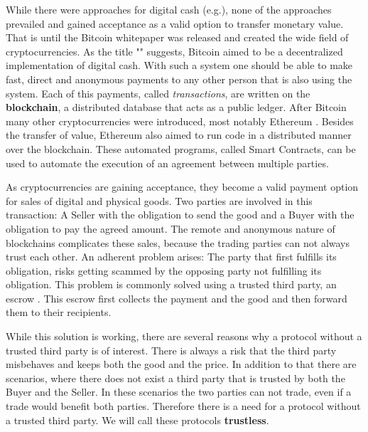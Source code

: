 \documentclass{cacthesis}
\begin{document}
	While there were approaches for digital cash (e.g.\cite{chaum_83}), none of the approaches prevailed and gained acceptance as a valid option to transfer monetary value. That is until the Bitcoin whitepaper \cite{nakamoto_bitcoin_nodate} was released and created the wide field of cryptocurrencies. As the title "" suggests, Bitcoin aimed to be a decentralized implementation of digital cash. With such a system one should be able to make fast, direct and anonymous payments to any other person that is also using the system. Each of this payments, called \emph{transactions}, are written on the \textbf{blockchain}, a distributed database that acts as a public ledger. After Bitcoin many other cryptocurrencies were introduced, most notably Ethereum \cite{buterin_ethereum_nodate}. Besides the transfer of value, Ethereum also aimed to run code in a distributed manner over the blockchain. These automated programs, called Smart Contracts, can be used to automate the execution of an agreement between multiple parties.\newline
	
	As cryptocurrencies are gaining acceptance, they become a valid payment option for sales of digital and physical goods. Two parties are involved in this transaction: A Seller with the obligation to send the good and a Buyer with the obligation to pay the agreed amount. The remote and anonymous nature of blockchains complicates these sales, because the trading parties can not always trust each other. An adherent problem arises: 
	The party that first fulfills its obligation, risks getting scammed by the opposing party not fulfilling its obligation.
	This problem is commonly solved using a trusted third party, an escrow \cite{kiayias_escrow_2017}. This escrow first collects the payment and the good and then forward them to their recipients. \newline 
	
	While this solution is working, there are several reasons why a protocol without a trusted third party is of interest. There is always a risk that the third party misbehaves and keeps both the good and the price. In addition to that there are scenarios, where there does not exist a third party that is trusted by both the Buyer and the Seller. In these scenarios the two parties can not trade, even if a trade would benefit both parties. Therefore there is a need for a protocol without a trusted third party. We will call these protocols \textbf{trustless}.\newline
	
\end{document}
